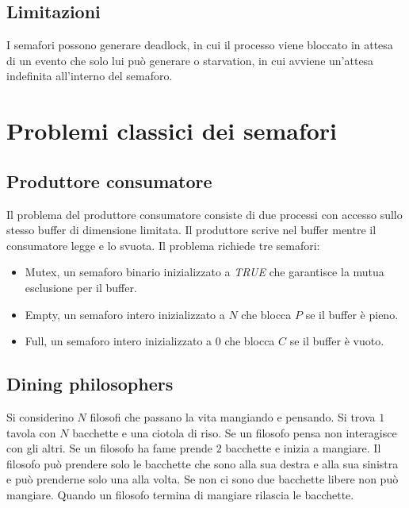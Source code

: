 \subsection{Limitazioni}
I semafori possono generare deadlock, in cui il processo viene bloccato in attesa di un evento che solo lui pu\`o generare o starvation, in cui avviene un'attesa indefinita all'interno
del semaforo. 
\section{Problemi classici dei semafori}
\subsection{Produttore consumatore}
Il problema del produttore consumatore consiste di due processi con accesso sullo stesso buffer di dimensione limitata. Il produttore scrive nel buffer  mentre il consumatore legge e
lo svuota. Il problema richiede tre semafori:
\begin{itemize}
	\item Mutex, un semaforo binario inizializzato a \emph{TRUE} che garantisce la mutua esclusione per il buffer.
	\item Empty, un semaforo intero inizializzato a $N$ che blocca $P$ se il buffer \`e pieno.
	\item Full, un semaforo intero inizializzato a $0$ che blocca $C$ se il buffer \`e vuoto.
\end{itemize}
\newpage
\begin{multicols}{2}
	
	\columnbreak
	
\end{multicols}
\subsection{Dining philosophers}
Si considerino $N$ filosofi che passano la vita mangiando e pensando. Si trova $1$ tavola con $N$ bacchette e una ciotola di riso. Se un filosofo pensa non interagisce con gli altri.
Se un filosofo ha fame prende $2$ bacchette e inizia a mangiare. Il filosofo pu\`o prendere solo le bacchette che sono alla sua destra e alla sua sinistra e pu\`o prenderne solo una 
alla volta. Se non ci sono due bacchette libere non pu\`o mangiare. Quando un filosofo termina di mangiare rilascia le bacchette.
